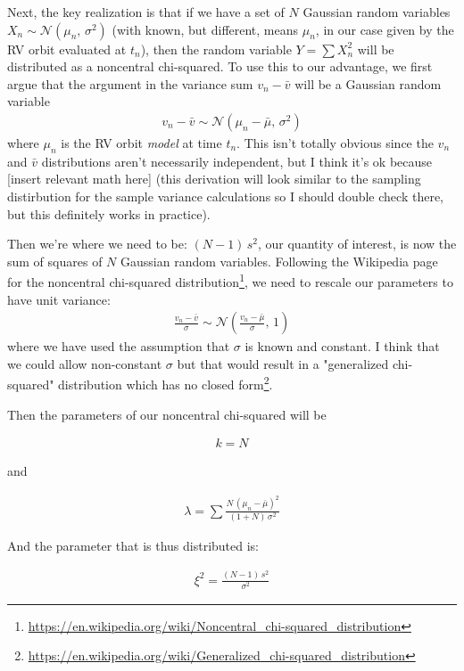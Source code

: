 \documentclass[modern, letterpaper]{aastex63}
\begin{document}
Next, the key realization is that if we have a set of $N$ Gaussian random variables $X_n \sim \mathcal{N}\left(\mu_n,\,\sigma^2\right)$ (with known, but different, means $\mu_n$, in our case given by the RV orbit evaluated at $t_n$), then the random variable $Y = \sum X_n^2$ will be distributed as a noncentral chi-squared.
To use this to our advantage, we first argue that the argument in the variance sum $v_n - \bar{v}$ will be a Gaussian random variable
\begin{eqnarray}
	v_n - \bar{v} \sim \mathcal{N}\left(\mu_n - \bar{\mu},\,\sigma^2\right)
\end{eqnarray}
where $\mu_n$ is the RV orbit \emph{model} at time $t_n$.
This isn't totally obvious since the $v_n$ and $\bar{v}$ distributions aren't necessarily independent, but I think it's ok because [insert relevant math here] (this derivation will look similar to the sampling distirbution for the sample variance calculations so I should double check there, but this definitely works in practice).

Then we're where we need to be: $(N - 1)\,s^2$, our quantity of interest, is now the sum of squares of $N$ Gaussian random variables.
Following the Wikipedia page for the noncentral chi-squared distribution\footnote{\url{https://en.wikipedia.org/wiki/Noncentral_chi-squared_distribution}}, we need to rescale our parameters to have unit variance:
\begin{eqnarray}
	\frac{v_n - \bar{v}}{\sigma} \sim \mathcal{N}\left(\frac{v_n - \bar{\mu}}{\sigma},\,1\right)
\end{eqnarray}
where we have used the assumption that $\sigma$ is known and constant.
I think that we could allow non-constant $\sigma$ but that would result in a "generalized chi-squared" distribution which has no closed form\footnote{\url{https://en.wikipedia.org/wiki/Generalized_chi-squared_distribution}}.

Then the parameters of our noncentral chi-squared will be

\begin{eqnarray}
	k = N
\end{eqnarray}

and

\begin{eqnarray}
	\lambda = \sum \frac{N\,(\mu_n - \bar{\mu})^2}{(1 + N)\,\sigma^2}
\end{eqnarray}

And the parameter that is thus distributed is:

\begin{eqnarray}
	\xi^2 = \frac{(N - 1)\,s^2}{\sigma^2}
\end{eqnarray}
\end{document}
